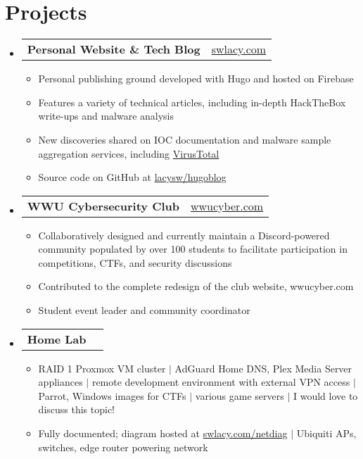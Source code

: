 \documentclass[10pt]{article}
\makeatletter
\newcommand{\resumeItem}[1]{
  \item\small{
    {#1 \vspace{-2pt}}
  }
}
\newcommand{\resumeProjectHeading}[2]{
    \item
    \begin{tabular*}{0.97\textwidth}{l@{\extracolsep{\fill}}r}
      \small#1 & #2 \\
    \end{tabular*}\vspace{-7pt}
}
\newcommand{\resumeSubHeadingListStart}{\begin{itemize}[leftmargin=0.15in, label={}]}
\newcommand{\resumeSubHeadingListEnd}{\end{itemize}}
\newcommand{\resumeItemListStart}{\begin{itemize}}
\newcommand{\resumeItemListEnd}{\end{itemize}\vspace{-5pt}}
\makeatother
\begin{document}
\section{Projects}
    \resumeSubHeadingListStart
      \resumeProjectHeading
          {\textbf{Personal Website \& Tech Blog}}{\href{https://swlacy.com}{swlacy.com}}
          \resumeItemListStart
            \resumeItem{Personal publishing ground developed with Hugo and hosted on Firebase}
            \resumeItem{Features a variety of technical articles, including in-depth HackTheBox write-ups and malware analysis}
            \resumeItem{New discoveries shared on IOC documentation and malware sample aggregation services, including \href{https://www.virustotal.com/gui/user/slak}{VirusTotal}}
            \resumeItem{Source code on GitHub at \href{https://github.com/lacysw/hugoblog}{lacysw/hugoblog}}
          \resumeItemListEnd
      \resumeProjectHeading
          {\textbf{WWU Cybersecurity Club}}{\href{https://wwucyber.com}{wwucyber.com}}
          \resumeItemListStart
            \resumeItem{Collaboratively designed and currently maintain a Discord-powered community populated by over 100 students to facilitate participation in competitions, CTFs, and security discussions}
            \resumeItem{Contributed to the complete redesign of the club website, wwucyber.com}
            \resumeItem{Student event leader and community coordinator}
          \resumeItemListEnd
      \resumeProjectHeading
          {\textbf{Home Lab}}{}
          \resumeItemListStart
            \resumeItem{RAID 1 Proxmox VM cluster $|$ AdGuard Home DNS, Plex Media Server appliances $|$ remote development environment with external VPN access $|$ Parrot, Windows images for CTFs $|$ various game servers $|$ I would love to discuss this topic!}
            \resumeItem{Fully documented; diagram hosted at \href{https://swlacy.com/netdiag}{swlacy.com/netdiag} $|$ Ubiquiti APs, switches, edge router powering network}
          \resumeItemListEnd
    \resumeSubHeadingListEnd
\end{document}

